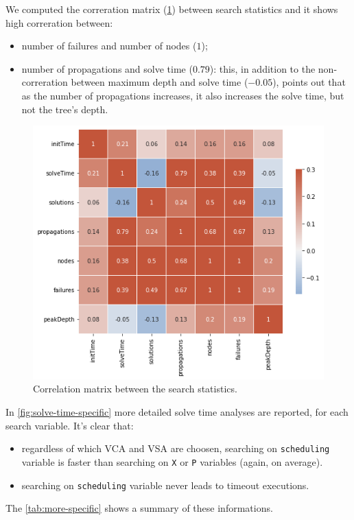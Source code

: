 \documentclass[10pt]{article}
\begin{document}
	We computed the correration matrix (\cref{fig:corr}) between search statistics
	and it shows high correration between:
	\begin{itemize}
		\item number of failures and number of nodes ($1$);
		\item number of propagations and solve time ($0.79$): this, in addition to the non-correration
			between maximum depth and solve time ($-0.05$), points out that as the number of
			propagations increases, it also increases the solve time, but not the tree's depth.
	\end{itemize}

	\begin{figure}
		\centering
		\includegraphics[width=.6\textwidth]{corr.png}
		\caption{Correlation matrix between the search statistics.}
		\label{fig:corr}
	\end{figure}

	\pagebreak

	In \cref{fig:solve-time-specific} more detailed solve time analyses are
	reported, for each search variable. It's clear that:
	\begin{itemize}
		\item regardless of which 
		VCA and VSA are choosen, searching on \texttt{scheduling} variable is faster
		than searching on \texttt{X} or \texttt{P} variables (again, on average).  
		\item searching on \texttt{scheduling} variable never leads to timeout executions.
	\end{itemize} 

	The \cref{tab:more-specific} shows a summary of these informations. 
\end{document}
